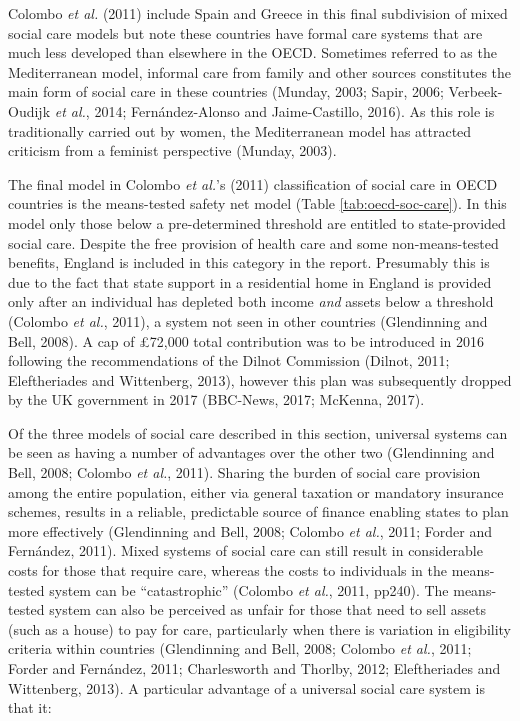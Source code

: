 \documentclass[12pt,a4paper,oneside,table]{report}
\begin{document}
Colombo \textit{et al.} (2011) include Spain and Greece in this final
subdivision of mixed social care models but note these countries have
formal care systems that are much less developed than elsewhere in the
OECD. Sometimes referred to as the Mediterranean model, informal care
from family and other sources constitutes the main form of social care
in these countries (Munday, 2003; Sapir, 2006; Verbeek-Oudijk \emph{et
al.}, 2014; Fernández-Alonso and Jaime-Castillo, 2016). As this role is
traditionally carried out by women, the Mediterranean model has
attracted criticism from a feminist perspective (Munday, 2003).

The final model in Colombo \textit{et al.}'s (2011) classification of
social care in OECD countries is the means-tested safety net model
(Table \ref{tab:oecd-soc-care}). In this model only those below a
pre-determined threshold are entitled to state-provided social care.
Despite the free provision of health care and some non-means-tested
benefits, England is included in this category in the report. Presumably
this is due to the fact that state support in a residential home in
England is provided only after an individual has depleted both income
\textit{and} assets below a threshold (Colombo \emph{et al.}, 2011), a
system not seen in other countries (Glendinning and Bell, 2008). A cap
of £72,000 total contribution was to be introduced in 2016 following the
recommendations of the Dilnot Commission (Dilnot, 2011; Eleftheriades
and Wittenberg, 2013), however this plan was subsequently dropped by the
UK government in 2017 (BBC-News, 2017; McKenna, 2017).

Of the three models of social care described in this section, universal
systems can be seen as having a number of advantages over the other two
(Glendinning and Bell, 2008; Colombo \emph{et al.}, 2011). Sharing the
burden of social care provision among the entire population, either via
general taxation or mandatory insurance schemes, results in a reliable,
predictable source of finance enabling states to plan more effectively
(Glendinning and Bell, 2008; Colombo \emph{et al.}, 2011; Forder and
Fernández, 2011). Mixed systems of social care can still result in
considerable costs for those that require care, whereas the costs to
individuals in the means-tested system can be ``catastrophic'' (Colombo
\emph{et al.}, 2011, pp240). The means-tested system can also be
perceived as unfair for those that need to sell assets (such as a house)
to pay for care, particularly when there is variation in eligibility
criteria within countries (Glendinning and Bell, 2008; Colombo \emph{et
al.}, 2011; Forder and Fernández, 2011; Charlesworth and Thorlby, 2012;
Eleftheriades and Wittenberg, 2013). A particular advantage of a
universal social care system is that it:
\end{document}
